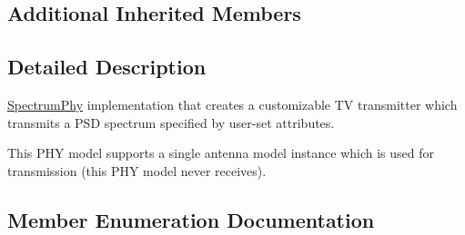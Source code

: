 \subsection*{Additional Inherited Members}


\subsection{Detailed Description}
\hyperlink{classns3_1_1SpectrumPhy}{Spectrum\+Phy} implementation that creates a customizable TV transmitter which transmits a P\+SD spectrum specified by user-\/set attributes.

This P\+HY model supports a single antenna model instance which is used for transmission (this P\+HY model never receives). 

\subsection{Member Enumeration Documentation}
